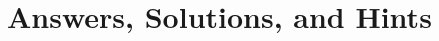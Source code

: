 \chapter{Answers, Solutions, and Hints}
\problemfont
\footnotesize

\begin{trivlist}
  \setlength{\parindent}{0pt}
  \setlength{\parskip}{0.5ex plus0.5ex}
  \raggedright
  
\end{trivlist}
